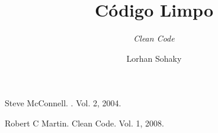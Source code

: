 \documentclass[aspectratio=169]{beamer}
\title{Código Limpo}
\subtitle{\textit{Clean Code}}
\author{Lorhan Sohaky}
\begin{document}
\begin{frame}
  \titlepage
\end{frame}



























\begin{frame}
	\begin{thebibliography}{10}
		\beamertemplatebookbibitems
		Steve McConnell.
		.
		\newblock Vol. 2, 2004.
		\beamertemplatearticlebibitems

		Robert C Martin.
		\newblock Clean Code.
		\newblock Vol. 1, 2008.
	\end{thebibliography}
\end{frame}
\end{document}
